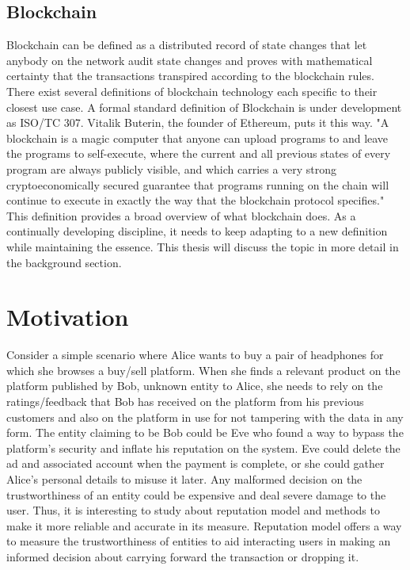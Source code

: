 \subsection{Blockchain}
Blockchain can be defined as a distributed record of state changes that let
anybody on the network audit state changes and proves with mathematical
certainty that the transactions transpired according to the blockchain rules.
There exist several definitions of blockchain technology each specific to their
closest use case. A formal standard definition of Blockchain is under
development as ISO/TC 307. Vitalik Buterin, the founder of Ethereum, puts it
this way.  "A blockchain is a magic computer that anyone can upload programs to
and leave the programs to self-execute, where the current and all previous
states of every program are always publicly visible, and which carries a very
strong cryptoeconomically secured guarantee that programs running on the chain
will continue to execute in exactly the way that the blockchain protocol
specifies."  This definition provides a broad overview of what blockchain does.
As a continually developing discipline, it needs to keep adapting to a new
definition while maintaining the essence. This thesis will discuss the topic in
more detail in the background section.

 
\section{Motivation}
Consider a simple scenario where Alice wants to buy a pair of headphones for
which she browses a buy/sell platform. When she finds a relevant product on the
platform published by Bob, unknown entity to Alice, she needs to rely on the
ratings/feedback that Bob has received on the platform from his previous
customers and also on the platform in use for not tampering with the data in
any form.  The entity claiming to be Bob could be Eve who found a way to bypass
the platform's security and inflate his reputation on the system. Eve could
delete the ad and associated account when the payment is complete, or she could
gather Alice’s personal details to misuse it later. Any malformed decision on
the trustworthiness of an entity could be expensive and deal severe damage to
the user. Thus, it is interesting to study about reputation model and methods
to make it more reliable and accurate in its measure. Reputation model offers a
way to measure the trustworthiness of entities to aid interacting users in
making an informed decision about carrying forward the transaction or dropping
it. 

